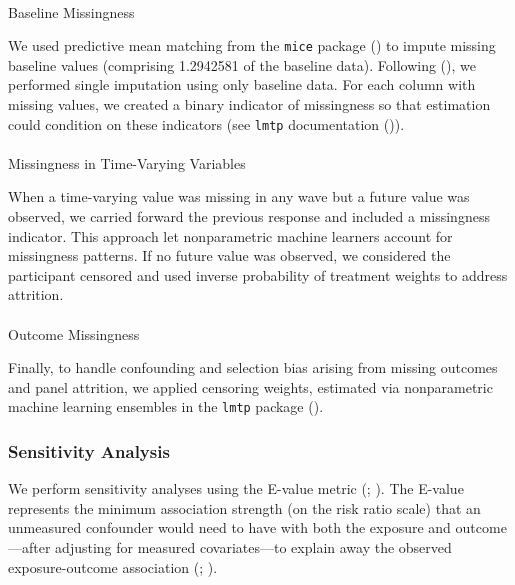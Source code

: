 \documentclass[
  single column]{article}
\makeatletter
\let\oldparagraph\paragraph
\renewcommand{\paragraph}{
    \@ifstar
      \xxxParagraphStar
      \xxxParagraphNoStar
  }
\newcommand{\xxxParagraphStar}[1]{\oldparagraph*{#1}\mbox{}}
\newcommand{\xxxParagraphNoStar}[1]{\oldparagraph{#1}\mbox{}}
\makeatother
\begin{document}
\paragraph{Baseline Missingness}\label{baseline-missingness}

We used predictive mean matching from the \texttt{mice} package
() to impute missing
baseline values (comprising 1.2942581 of the baseline data). Following
(), we performed single imputation using only baseline data. For
each column with missing values, we created a binary indicator of
missingness so that estimation could condition on these indicators (see
\texttt{lmtp} documentation ()).

\paragraph{Missingness in Time-Varying
Variables}\label{missingness-in-time-varying-variables}

When a time-varying value was missing in any wave but a future value was
observed, we carried forward the previous response and included a
missingness indicator. This approach let nonparametric machine learners
account for missingness patterns. If no future value was observed, we
considered the participant censored and used inverse probability of
treatment weights to address attrition.

\paragraph{Outcome Missingness}\label{outcome-missingness}

Finally, to handle confounding and selection bias arising from missing
outcomes and panel attrition, we applied censoring weights, estimated
via nonparametric machine learning ensembles in the \texttt{lmtp}
package ().

\subsubsection{Sensitivity Analysis}\label{sensitivity-analysis}

We perform sensitivity analyses using the E-value metric
(;
). The E-value
represents the minimum association strength (on the risk ratio scale)
that an unmeasured confounder would need to have with both the exposure
and outcome---after adjusting for measured covariates---to explain away
the observed exposure-outcome association
(;
).
\end{document}
